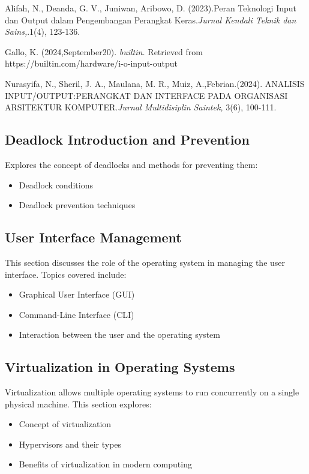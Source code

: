 \documentclass[12pt]{article}
\begin{document}
\begin{thebibliography}{10}
    Alifah, N., Deanda, G. V., Juniwan, Aribowo, D. (2023).Peran Teknologi Input dan Output dalam Pengembangan Perangkat Keras.\textit{Jurnal Kendali Teknik dan Sains,}.1(4), 123-136.

    Gallo, K. (2024,September20). \textit{builtin.} Retrieved from https://builtin.com/hardware/i-o-input-output
    
    Nurasyifa, N., Sheril, J. A., Maulana, M. R., Muiz, A.,Febrian.(2024). ANALISIS INPUT/OUTPUT:PERANGKAT DAN INTERFACE PADA ORGANISASI ARSITEKTUR KOMPUTER.\textit{Jurnal Multidisiplin Saintek,} 3(6), 100-111.


\end{thebibliography}

\pagebreak

\subsection{Deadlock Introduction and Prevention}
Explores the concept of deadlocks and methods for preventing them:
\begin{itemize}
    \item Deadlock conditions
    \item Deadlock prevention techniques
\end{itemize}

\subsection{User Interface Management}
This section discusses the role of the operating system in managing the user interface. Topics covered include:
\begin{itemize}
    \item Graphical User Interface (GUI)
    \item Command-Line Interface (CLI)
    \item Interaction between the user and the operating system
\end{itemize}

\subsection{Virtualization in Operating Systems}
Virtualization allows multiple operating systems to run concurrently on a single physical machine. This section explores:
\begin{itemize}
    \item Concept of virtualization
    \item Hypervisors and their types
    \item Benefits of virtualization in modern computing
\end{itemize}
\end{document}
